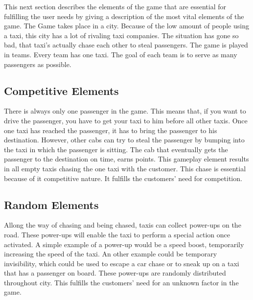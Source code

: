 

This next section describes the elements of the game that are essential for fulfilling the user needs by giving a description of the most vital elements of the game. The Game takes place in a city. Because of the low amount of people using a taxi, this city has a lot of rivaling taxi companies. The situation has gone so bad, that taxi's actually chase each other to steal passengers. The game is played in teams. Every team has one taxi. The goal of each team is to serve as many passengers as possible.


\subsection{Competitive Elements}
There is always only one passenger in the game. This means that, if you want to drive the passenger, you have to get your taxi to him before all other taxis. Once one taxi has reached the passenger, it has to bring the passenger to his destination. However, other cabs can try to steal the passenger by bumping into the taxi in which the passenger is sitting. The cab that eventually gets the passenger to the destination on time, earns points. This gameplay element results in all empty taxis chasing the one taxi with the customer. This chase is essential because of it competitive nature. It fulfills the customers' need for competition. 

\subsection{Random Elements}

Allong the way of chasing and being chased, taxis can collect power-ups on the road. These power-ups will enable the taxi to perform a special action once activated. A simple example of a power-up would be a speed boost, temporarily increasing the speed of the taxi. An other example could be temporary invisibility, which could be used to escape a car chase or to sneak up on a taxi that has a passenger on board. These power-ups are randomly distributed throughout city. This fulfills the customers' need for an unknown factor in the game. 

